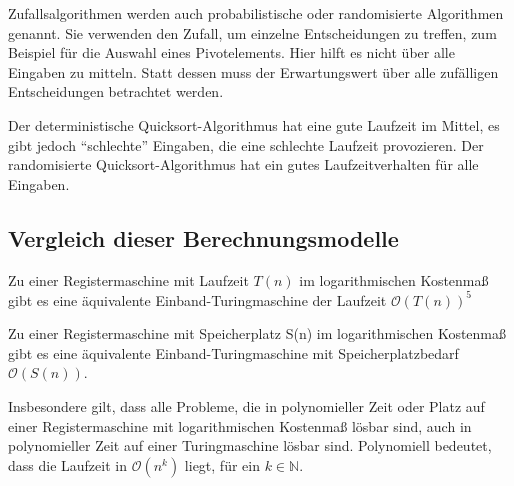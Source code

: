 Zufallsalgorithmen werden auch probabilistische oder randomisierte Algorithmen genannt. Sie verwenden den Zufall, um einzelne Entscheidungen zu treffen, zum Beispiel für die Auswahl eines Pivotelements. Hier hilft es nicht über alle Eingaben zu mitteln. Statt dessen muss der Erwartungswert über alle zufälligen Entscheidungen betrachtet werden.

Der deterministische Quicksort-Algorithmus hat eine gute Laufzeit im Mittel, es gibt jedoch "`schlechte"' Eingaben, die eine schlechte Laufzeit provozieren. Der randomisierte Quicksort-Algorithmus hat ein gutes Laufzeitverhalten für alle Eingaben.

%
%

\subsection{Vergleich dieser Berechnungsmodelle}
\begin{Satz}
\hspace{\parindent}Zu einer Registermaschine mit Laufzeit $T(n)$ im logarithmischen Kostenmaß gibt es eine äquivalente Einband-Turingmaschine der Laufzeit $\mathcal{O}(T(n))^5$
\end{Satz}

\begin{Satz}
\hspace{\parindent}Zu einer Registermaschine mit Speicherplatz S(n) im logarithmischen Kostenmaß gibt es eine äquivalente Einband-Turingmaschine mit Speicherplatzbedarf $\mathcal{O}(S(n))$.
\end{Satz}

Insbesondere gilt, dass alle Probleme, die in polynomieller Zeit oder Platz auf einer Registermaschine mit logarithmischen Kostenmaß lösbar sind, auch in polynomieller Zeit auf einer Turingmaschine lösbar sind. Polynomiell bedeutet, dass die Laufzeit in $\mathcal{O}(n^k)$ liegt, für ein $k \in \mathbb{N}$.

